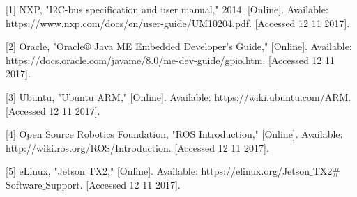 \documentclass[letterpaper,10pt,serif,draftclsnofoot,onecolumn,compsoc,titlepage]{IEEEtran}
\begin{document}
[1]
NXP, "I2C-bus specification and user manual," 2014. [Online]. Available: https://www.nxp.com/docs/en/user-guide/UM10204.pdf. [Accessed 12 11 2017].

[2]
Oracle, "Oracle® Java ME Embedded Developer's Guide," [Online]. Available: https://docs.oracle.com/javame/8.0/me-dev-guide/gpio.htm. [Accessed 12 11 2017].

[3]
Ubuntu, "Ubuntu ARM," [Online]. Available: https://wiki.ubuntu.com/ARM. [Accessed 12 11 2017].

[4]
Open Source Robotics Foundation, "ROS Introduction," [Online]. Available: http://wiki.ros.org/ROS/Introduction. [Accessed 12 11 2017].

[5]
eLinux, "Jetson TX2," [Online]. Available: https://elinux.org/Jetson$\_$TX2$\#$Software$\_$Support. [Accessed 12 11 2017].
\end{document}
